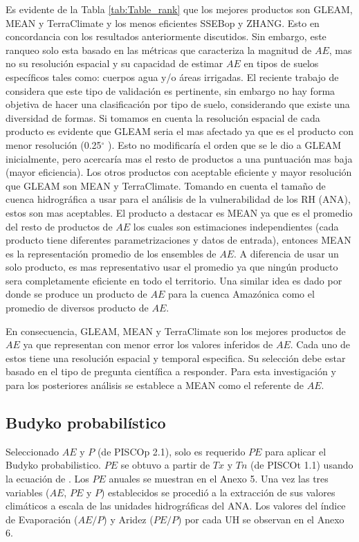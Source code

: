 \documentclass[12pt]{article}
\begin{document}
Es evidente de la Tabla \ref{tab:Table_rank} que los mejores productos son GLEAM, MEAN y TerraClimate y los menos eficientes SSEBop y ZHANG. Esto en concordancia con los resultados anteriormente discutidos. Sin embargo, este ranqueo solo esta basado en las métricas que caracteriza la magnitud de $AE$, mas no su resolución espacial y su capacidad de estimar $AE$ en tipos de suelos específicos tales como: cuerpos agua y/o áreas irrigadas. El reciente trabajo de \citet{Weerasinghe2019discuss} considera que este tipo de validación es pertinente, sin embargo no hay forma objetiva de hacer una clasificación por tipo de suelo, considerando que existe una diversidad de formas. Si tomamos en cuenta la resolución espacial de cada producto es evidente que GLEAM seria el mas afectado ya que es el producto con menor resolución (0.25$^{\circ}$ ). Esto no modificaría el orden que se le dio a GLEAM inicialmente, pero acercaría mas el resto de productos a una puntuación mas baja (mayor eficiencia). Los otros productos con aceptable eficiente y mayor resolución que GLEAM son MEAN y TerraClimate. Tomando en cuenta el tamaño de cuenca hidrográfica a usar para el análisis de la vulnerabilidad de los RH (ANA), estos son mas aceptables. El producto a destacar es MEAN ya que es el promedio del resto de productos de $AE$ los cuales son estimaciones independientes (cada producto tiene diferentes parametrizaciones y datos de entrada), entonces MEAN es la representación promedio de los ensembles de $AE$. A diferencia de usar un solo producto, es mas representativo usar el promedio ya que ningún producto sera completamente eficiente en todo el territorio. Una similar idea es dado por \citet{da2019spatial} donde se produce un producto de $AE$ para la cuenca Amazónica como el promedio de diversos producto de $AE$.

En consecuencia, GLEAM, MEAN y TerraClimate son los mejores productos de $AE$ ya que representan con menor error los valores inferidos de $AE$. Cada uno de estos tiene una resolución espacial y temporal especifica. Su selección debe estar basado en el tipo de pregunta científica a responder. Para esta investigación y para los posteriores análisis se establece a MEAN como el referente de $AE$.

\subsection{Budyko probabilístico}

Seleccionado $AE$ y $P$ (de PISCOp 2.1), solo es requerido $PE$ para aplicar el Budyko probabilistico. $PE$ se obtuvo a partir de $Tx$ y $Tn$ (de PISCOt 1.1) usando la ecuación de \citet{Hargreaves1985}. Los $PE$ anuales se muestran en el Anexo 5. Una vez las tres variables ($AE$, $PE$ y $P$) establecidos se procedió a la extracción de sus valores climáticos a escala de las unidades hidrográficas del ANA. Los valores del índice de Evaporación ($AE/P$) y Aridez ($PE/P$) por cada UH se observan en el Anexo 6. 
\end{document}
